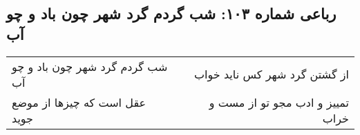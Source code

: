 \begin{center}
\section*{رباعی شماره ۱۰۳: شب گردم گرد شهر چون باد و چو آب}
\label{sec:0103}
\begin{longtable}{l p{0.5cm} r}
شب گردم گرد شهر چون باد و چو آب
&&
از گشتن گرد شهر کس ناید خواب
\\
عقل است که چیزها از موضع جوید
&&
تمییز و ادب مجو تو از مست و خراب
\\
\end{longtable}
\end{center}
